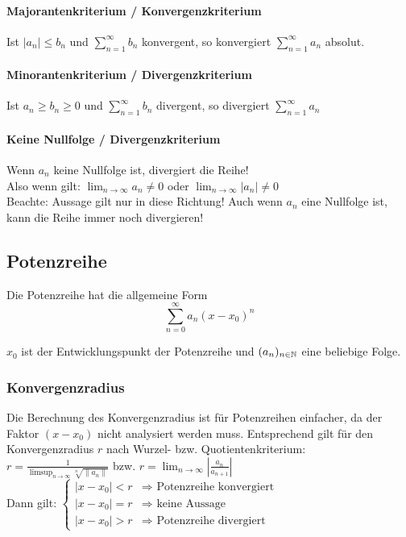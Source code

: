 \paragraph{Majorantenkriterium / Konvergenzkriterium}
\vspace{-0.2cm}
Ist $|a_n| \leq b_n$ und $\sum_{n=1}^\infty b_n$ konvergent, so konvergiert
$\sum_{n=1}^\infty a_n$ absolut.

\paragraph{Minorantenkriterium / Divergenzkriterium}
\vspace{-0.2cm}
Ist $a_n \geq b_n \geq 0$ und $\sum_{n=1}^\infty b_n$ divergent, so divergiert
$\sum_{n=1}^\infty a_n$

\paragraph{Keine Nullfolge / Divergenzkriterium}
\vspace{-0.2cm}
Wenn $a_n$ keine Nullfolge ist, divergiert die Reihe! \\
Also wenn gilt: $\lim_{n \to \infty} a_n \neq 0$ oder $\lim_{n \to \infty} |a_n| \neq 0$ \\
Beachte: Aussage gilt nur in diese Richtung! Auch wenn $a_n$ eine Nullfolge ist, kann die Reihe immer noch divergieren!

\subsection{Potenzreihe}
\vspace{-0.2cm}
Die Potenzreihe hat die allgemeine Form
\[
\sum_{n=0}^\infty a_n (x - x_0)^n
\]

$x_0$ ist der Entwicklungspunkt der Potenzreihe und $(a_n)_{n \in \mathbb{N}}$ eine
beliebige Folge.

\subsubsection{Konvergenzradius}
\vspace{-0.2cm}
Die Berechnung des Konvergenzradius ist für Potenzreihen einfacher, da der
Faktor $(x - x_0)$ nicht analysiert werden muss. Entsprechend gilt für den
Konvergenzradius $r$ nach Wurzel- bzw. Quotientenkriterium:\\
$r = \frac{1}{\limsup_{n\to\infty} \sqrt[n]{\|a_n\|}}$ bzw.
$r = \lim_{n\to\infty} \left | \frac{a_n}{a_{n+1}} \right |$ \\
Dann gilt:
$
\begin{cases}
	|x - x_0| < r & \Rightarrow \text{ Potenzreihe konvergiert} \\
	|x - x_0| = r & \Rightarrow \text{ keine Aussage}\\
	|x - x_0| > r & \Rightarrow \text{ Potenzreihe divergiert}
\end{cases}
$

